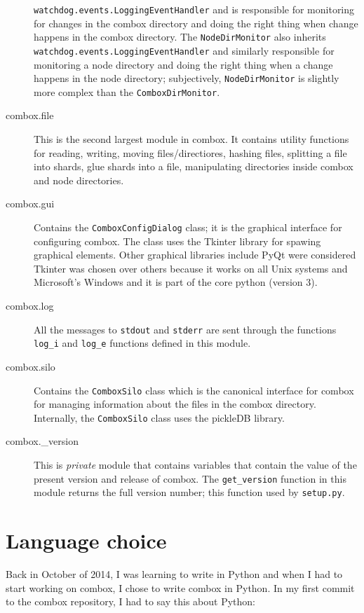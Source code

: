 \begin{description}
  \verb+watchdog.events.LoggingEventHandler+ and is responsible for
  monitoring for changes in the combox directory and doing the right
  thing when change happens in the combox directory. The
  \verb+NodeDirMonitor+ also inherits
  \verb+watchdog.events.LoggingEventHandler+ and similarly responsible
  for monitoring a node directory and doing the right thing when a
  change happens in the node directory; subjectively,
  \verb+NodeDirMonitor+ is slightly more complex than the
  \verb+ComboxDirMonitor+.
\item[combox.file] This is the second largest module in combox. It
  contains utility functions for reading, writing, moving
  files/directiores, hashing files, splitting a file into shards, glue
  shards into a file, manipulating directories inside combox and node
  directories.
\item[combox.gui] Contains the \verb+ComboxConfigDialog+ class; it is
  the graphical interface for configuring combox. The class uses the
  Tkinter library\cite{pylib:tkinter} for spawing graphical
  elements. Other graphical libraries include PyQt\cite{pylib:qt}
  were considered Tkinter was chosen over others because it works on
  all Unix systems and Microsoft's Windows and it is part of the core
  python (version 3).
\item[combox.log] All the messages to \verb+stdout+ and \verb+stderr+
  are sent through the functions \verb+log_i+ and \verb+log_e+
  functions defined in this module.
\item[combox.silo] Contains the \verb+ComboxSilo+ class which is the
  canonical interface for combox for managing information about the
  files in the combox directory. Internally, the \verb+ComboxSilo+
  class uses the pickleDB library\cite{pylib:pickledb}.
\item[combox.\_version] This is \emph{private} module that contains
  variables that contain the value of the present version and release
  of combox. The \verb+get_version+ function in this module returns
  the full version number; this function used by \verb+setup.py+.
\end{description}

\section{Language choice}

Back in October of 2014, I was learning to write in Python and when I
had to start working on combox, I chose to write combox in Python. In
my first commit to the combox repository, I had to say this about
Python:

